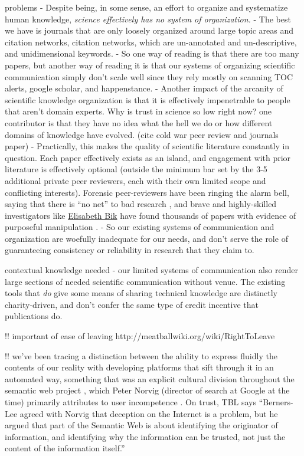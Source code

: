 \documentclass[10pt]{article}
\begin{document}
\begin{multicols}{2}
problems - Despite being, in some sense, an effort to organize and
systematize human knowledge, \emph{science effectively has no system of
organization.} - The best we have is journals that are only loosely
organized around large topic areas and citation networks, citation
networks, which are un-annotated and un-descriptive, and unidimensional
keywords. - So one way of reading \cite{chuSlowedCanonicalProgress2021}  is that there are too many papers,
but another way of reading it is that our systems of organizing
scientific communication simply don't scale well since they rely mostly
on scanning TOC alerts, google scholar, and happenstance. - Another
impact of the arcanity of scientific knowledge organization is that it
is effectively impenetrable to people that aren't domain experts. Why is
trust in science so low right now? one contributor is that they have no
idea what the hell we do or how different domains of knowledge have
evolved. (cite cold war peer review and journals paper) - Practically,
this makes the quality of scientific literature constantly in question.
Each paper effectively exists as an island, and engagement with prior
literature is effectively optional (outside the minimum bar set by the
3-5 additional private peer reviewers, each with their own limited scope
and conflicting interests). Forensic peer-reviewers have been ringing
the alarm bell, saying that there is ``no net'' to bad research \cite{heathersRealScandalIvermectin2021} , and brave and
highly-skilled investigators like
\href{https://scienceintegritydigest.com/}{Elisabeth Bik} have found
thousands of papers with evidence of purposeful manipulation \cite{shenMeetThisSuperspotter2020, bikPrevalenceInappropriateImage2016} . -
So our existing systems of communication and organization are woefully
inadequate for our needs, and don't serve the role of guaranteeing
consistency or reliability in research that they claim to.

contextual knowledge needed - our limited systems of communication also
render large sections of needed scientific communication without venue.
The existing tools that \emph{do} give some means of sharing technical
knowledge are distinctly charity-driven, and don't confer the same type
of credit incentive that publications do.

!! important of ease of leaving
http://meatballwiki.org/wiki/RightToLeave

!! we've been tracing a distinction between the ability to express
fluidly the contents of our reality with developing platforms that sift
through it in an automated way, something that was an explicit cultural
division throughout the semantic web project \cite{swartzTechniquesMassCollaboration2006} , which Peter Norvig (director
of search at Google at the time) primarily attributes to user
incompetence \cite{lombardiGoogleExecChallenges2007} . On trust,
TBL says ``Berners-Lee agreed with Norvig that deception on the Internet
is a problem, but he argued that part of the Semantic Web is about
identifying the originator of information, and identifying why the
information can be trusted, not just the content of the information
itself.''


\end{multicols}
\end{document}
